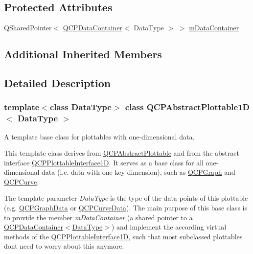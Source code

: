 \subsection*{Protected Attributes}
\begin{DoxyCompactItemize}
\item 
Q\+Shared\+Pointer$<$ \hyperlink{class_q_c_p_data_container}{Q\+C\+P\+Data\+Container}$<$ Data\+Type $>$ $>$ \hyperlink{class_q_c_p_abstract_plottable1_d_ac139cf70590707a1fb40eabe97fac246}{m\+Data\+Container}
\end{DoxyCompactItemize}
\subsection*{Additional Inherited Members}


\subsection{Detailed Description}
\subsubsection*{template$<$class Data\+Type$>$\newline
class Q\+C\+P\+Abstract\+Plottable1\+D$<$ Data\+Type $>$}

A template base class for plottables with one-\/dimensional data. 

This template class derives from \hyperlink{class_q_c_p_abstract_plottable}{Q\+C\+P\+Abstract\+Plottable} and from the abstract interface \hyperlink{class_q_c_p_plottable_interface1_d}{Q\+C\+P\+Plottable\+Interface1D}. It serves as a base class for all one-\/dimensional data (i.\+e. data with one key dimension), such as \hyperlink{class_q_c_p_graph}{Q\+C\+P\+Graph} and \hyperlink{class_q_c_p_curve}{Q\+C\+P\+Curve}.

The template parameter {\itshape Data\+Type} is the type of the data points of this plottable (e.\+g. \hyperlink{class_q_c_p_graph_data}{Q\+C\+P\+Graph\+Data} or \hyperlink{class_q_c_p_curve_data}{Q\+C\+P\+Curve\+Data}). The main purpose of this base class is to provide the member {\itshape m\+Data\+Container} (a shared pointer to a \hyperlink{class_q_c_p_data_container}{Q\+C\+P\+Data\+Container$<$Data\+Type$>$}) and implement the according virtual methods of the \hyperlink{class_q_c_p_plottable_interface1_d}{Q\+C\+P\+Plottable\+Interface1D}, such that most subclassed plottables don\textquotesingle{}t need to worry about this anymore.

